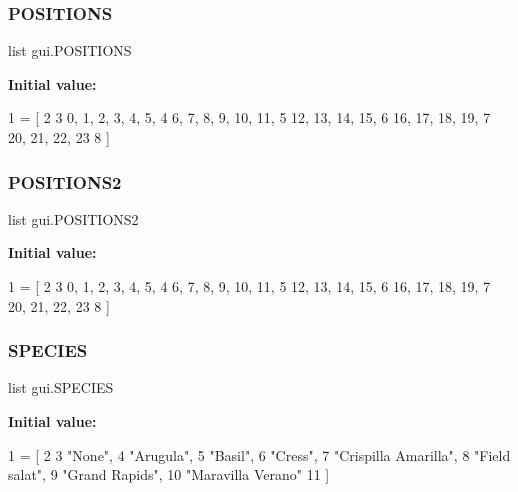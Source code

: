 \subsubsection{\texorpdfstring{P\+O\+S\+I\+T\+I\+O\+NS}{POSITIONS}}
{\footnotesize\ttfamily list gui.\+P\+O\+S\+I\+T\+I\+O\+NS}

{\bfseries Initial value\+:}
\begin{DoxyCode}
1 =  [
2     
3     0, 1, 2, 3, 4, 5,
4     6, 7, 8, 9, 10, 11,
5     12, 13, 14, 15,
6     16, 17, 18, 19,
7     20, 21, 22, 23
8 ]
\end{DoxyCode}
\mbox{\label{namespacegui_accf4f8938f1edcc500090c6b9fdb9b38_accf4f8938f1edcc500090c6b9fdb9b38}} 
\subsubsection{\texorpdfstring{P\+O\+S\+I\+T\+I\+O\+N\+S2}{POSITIONS2}}
{\footnotesize\ttfamily list gui.\+P\+O\+S\+I\+T\+I\+O\+N\+S2}

{\bfseries Initial value\+:}
\begin{DoxyCode}
1 =  [
2     
3     0, 1, 2, 3, 4, 5,
4     6, 7, 8, 9, 10, 11,
5     12, 13, 14, 15,
6     16, 17, 18, 19,
7     20, 21, 22, 23
8 ]
\end{DoxyCode}
\mbox{\label{namespacegui_af2f59838afad1475cfd5cbf4e921aadf_af2f59838afad1475cfd5cbf4e921aadf}} 
\subsubsection{\texorpdfstring{S\+P\+E\+C\+I\+ES}{SPECIES}}
{\footnotesize\ttfamily list gui.\+S\+P\+E\+C\+I\+ES}

{\bfseries Initial value\+:}
\begin{DoxyCode}
1 =  [
2     
3            \textcolor{stringliteral}{"None"},
4            \textcolor{stringliteral}{"Arugula"},
5            \textcolor{stringliteral}{"Basil"},
6            \textcolor{stringliteral}{"Cress"},
7            \textcolor{stringliteral}{"Crispilla Amarilla"},
8            \textcolor{stringliteral}{"Field salat"},
9            \textcolor{stringliteral}{"Grand Rapids"},
10            \textcolor{stringliteral}{"Maravilla Verano"}
11 ]
\end{DoxyCode}

